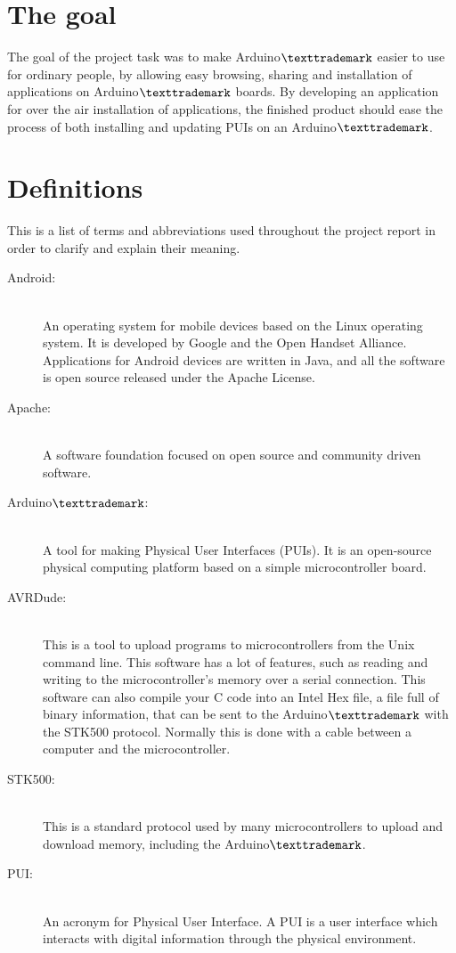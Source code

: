 \section{The goal}
The goal of the project task was to make Arduino$\texttrademark$ easier to use for ordinary people, by allowing easy browsing, sharing and installation of applications on Arduino$\texttrademark$ boards. By developing an application for over the air installation of applications, the finished product should ease the process of both installing and updating PUIs on an Arduino$\texttrademark$.


\section{Definitions}
This is a list of terms and abbreviations used throughout the project report in order to clarify and explain their meaning.

\begin{description}

\item[Android:]\hfill \\
An operating system for mobile devices based on the Linux operating system. It is developed by Google and the Open Handset Alliance. Applications for Android devices are written in Java, and all the software is open source released under the Apache License.

\item[Apache:] \hfill \\
A software foundation focused on open source and community driven software.

\item[Arduino$\texttrademark$:]\hfill \\
A tool for making Physical User Interfaces (PUIs). It is an open-source physical computing platform based on a simple microcontroller board.

\item[AVRDude:]\hfill \\
This is a tool to upload programs to microcontrollers from the Unix command line. This software has a lot of features, such as reading and writing to the microcontroller's memory over a serial connection. This software can also compile your C code into an Intel Hex file, a file full of binary information, that can be sent to the Arduino$\texttrademark$ with the STK500 protocol. Normally this is done with a cable between a computer and the microcontroller.

\item[STK500:]\hfill \\
This is a standard protocol used by many microcontrollers to upload and download memory, including the Arduino$\texttrademark$.

\item[PUI:]\hfill \\
An acronym for Physical User Interface. A PUI is a user interface which interacts with digital information through the physical environment.

\end{description}

